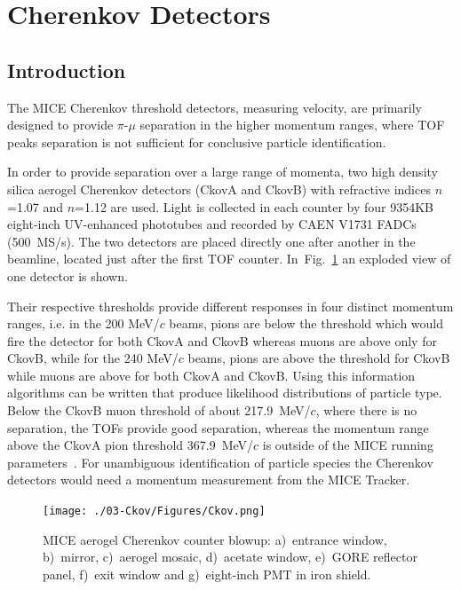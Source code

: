 \graphicspath{{03-Ckov/Figures/}}

\section{Cherenkov Detectors}
\label{Sect:Ckov}

\subsection{Introduction}
\label{SubSect:Ckov_Intro}

The MICE Cherenkov threshold detectors, measuring velocity, are primarily designed to provide $\pi$-$\mu$ separation in the higher momentum ranges, where TOF peaks separation is not sufficient for conclusive particle identification.

In order to provide separation over a large range of momenta, two high density silica aerogel Cherenkov detectors (CkovA and CkovB) with refractive indices $n$=1.07 and $n$=1.12 are used.
Light is collected in each counter by four 9354KB eight-inch UV-enhanced phototubes and recorded by CAEN V1731 FADCs (500~MS/s).
The two detectors are placed directly one after another in the beamline, located just after the first TOF counter. In~Fig.~\ref{fig:ckov1} an exploded view of one detector is shown.

Their respective thresholds provide different responses in four distinct momentum ranges, i.e. in the 200 MeV/$c$ beams, pions are below the threshold which would fire the detector for both CkovA and CkovB whereas muons are above only for CkovB, while for the 240 MeV/$c$ beams, pions are above the threshold for CkovB while muons are above for both CkovA and CkovB. Using this information algorithms can be written that produce likelihood distributions of particle type.
Below the CkovB muon threshold of about 217.9~MeV/$c$, where there is no separation, the TOFs provide good separation, whereas the momentum range above the CkovA pion threshold 367.9~MeV/$c$ is outside of the MICE running parameters~\cite{NOTE473}.
For unambiguous identification of particle species the Cherenkov detectors would need a momentum measurement from the MICE Tracker.

\begin{figure}[htb!]
  \begin{center}
    \texttt{[image: ./03-Ckov/Figures/Ckov.png]}
    \caption{MICE aerogel Cherenkov counter blowup: a)~entrance window, b)~mirror, c)~aerogel mosaic, d)~acetate window, e)~GORE reflector panel, f)~exit window and g)~eight-inch PMT in iron shield.}
    \label{fig:ckov1}
  \end{center}
\end{figure}

